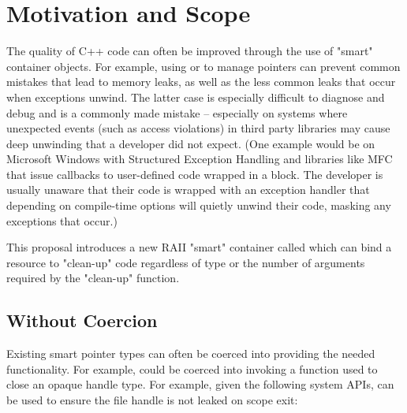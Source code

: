 \documentclass[ebook,11pt,article]{memoir}
\begin{document}
\chapter{Motivation and Scope}
The quality of C++ code can often be improved through the use of "smart" container objects.  For example, using  or  to manage pointers can prevent common mistakes that lead to memory leaks, as well as the less common leaks that occur when exceptions unwind.  The latter case is especially difficult to diagnose and debug and is a commonly made mistake -- especially on systems where unexpected events (such as access violations) in third party libraries may cause deep unwinding that a developer did not expect.  (One example would be on Microsoft Windows with Structured Exception Handling and libraries like MFC that issue callbacks to user-defined code wrapped in a  block.  The developer is usually unaware that their code is wrapped with an exception handler that depending on compile-time options will quietly unwind their code, masking any exceptions that occur.)

This proposal introduces a new RAII "smart" container called  which can bind a resource to "clean-up" code regardless of type or the number of arguments required by the "clean-up" function.

\section {Without Coercion}
Existing smart pointer types can often be coerced into providing the needed functionality.  For example,  could be coerced into invoking a function used to close an opaque handle type.  For example, given the following system APIs,  can be used to ensure the file handle is not leaked on scope exit:
\end{document}
